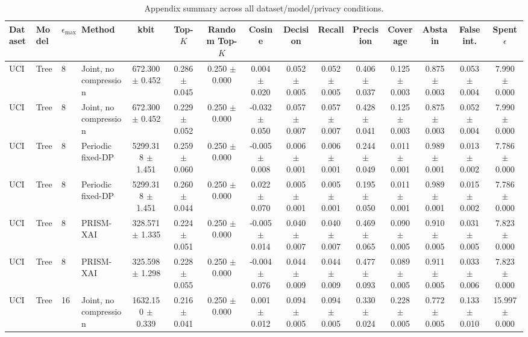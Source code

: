 \begin{table}[t]
\caption{Appendix summary across all dataset/model/privacy conditions.}
\label{tab:appendix-conditions}
\centering
\scriptsize
\setlength{\tabcolsep}{2.5pt}
\begin{tabular}{llllccccccccccc}
\toprule
Dataset & Model & $\epsilon_{\max}$ & Method & kbit & Top-$K$ & Random Top-$K$ & Cosine & Decision & Recall & Precision & Coverage & Abstain & False int. & Spent $\epsilon$ \\
\midrule
UCI & Tree & 8 & Joint, no compression & 672.300 $\pm$ 0.452 & 0.286 $\pm$ 0.045 & 0.250 $\pm$ 0.000 & 0.004 $\pm$ 0.020 & 0.052 $\pm$ 0.005 & 0.052 $\pm$ 0.005 & 0.406 $\pm$ 0.037 & 0.125 $\pm$ 0.003 & 0.875 $\pm$ 0.003 & 0.053 $\pm$ 0.004 & 7.990 $\pm$ 0.000 \\
UCI & Tree & 8 & Joint, no compression & 672.300 $\pm$ 0.452 & 0.229 $\pm$ 0.052 & 0.250 $\pm$ 0.000 & -0.032 $\pm$ 0.050 & 0.057 $\pm$ 0.007 & 0.057 $\pm$ 0.007 & 0.428 $\pm$ 0.041 & 0.125 $\pm$ 0.003 & 0.875 $\pm$ 0.003 & 0.052 $\pm$ 0.004 & 7.990 $\pm$ 0.000 \\
UCI & Tree & 8 & Periodic fixed-DP & 5299.318 $\pm$ 1.451 & 0.259 $\pm$ 0.060 & 0.250 $\pm$ 0.000 & -0.005 $\pm$ 0.008 & 0.006 $\pm$ 0.001 & 0.006 $\pm$ 0.001 & 0.244 $\pm$ 0.049 & 0.011 $\pm$ 0.001 & 0.989 $\pm$ 0.001 & 0.013 $\pm$ 0.002 & 7.786 $\pm$ 0.000 \\
UCI & Tree & 8 & Periodic fixed-DP & 5299.318 $\pm$ 1.451 & 0.260 $\pm$ 0.044 & 0.250 $\pm$ 0.000 & 0.022 $\pm$ 0.070 & 0.005 $\pm$ 0.001 & 0.005 $\pm$ 0.001 & 0.195 $\pm$ 0.050 & 0.011 $\pm$ 0.001 & 0.989 $\pm$ 0.001 & 0.015 $\pm$ 0.002 & 7.786 $\pm$ 0.000 \\
UCI & Tree & 8 & PRISM-XAI & 328.571 $\pm$ 1.335 & 0.224 $\pm$ 0.051 & 0.250 $\pm$ 0.000 & -0.005 $\pm$ 0.014 & 0.040 $\pm$ 0.007 & 0.040 $\pm$ 0.007 & 0.469 $\pm$ 0.065 & 0.090 $\pm$ 0.005 & 0.910 $\pm$ 0.005 & 0.031 $\pm$ 0.005 & 7.823 $\pm$ 0.000 \\
UCI & Tree & 8 & PRISM-XAI & 325.598 $\pm$ 1.298 & 0.228 $\pm$ 0.055 & 0.250 $\pm$ 0.000 & -0.004 $\pm$ 0.076 & 0.044 $\pm$ 0.009 & 0.044 $\pm$ 0.009 & 0.477 $\pm$ 0.093 & 0.089 $\pm$ 0.005 & 0.911 $\pm$ 0.005 & 0.033 $\pm$ 0.006 & 7.823 $\pm$ 0.000 \\
UCI & Tree & 16 & Joint, no compression & 1632.150 $\pm$ 0.339 & 0.216 $\pm$ 0.041 & 0.250 $\pm$ 0.000 & 0.001 $\pm$ 0.012 & 0.094 $\pm$ 0.005 & 0.094 $\pm$ 0.005 & 0.330 $\pm$ 0.024 & 0.228 $\pm$ 0.005 & 0.772 $\pm$ 0.005 & 0.133 $\pm$ 0.010 & 15.997 $\pm$ 0.000 \\

\end{tabular}
\end{table}
